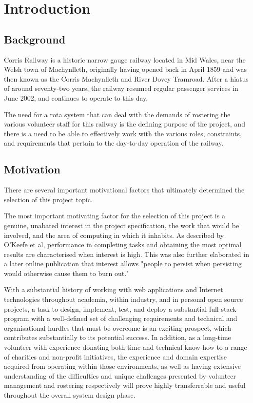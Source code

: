 \chapter{Introduction}

\section{Background}
Corris Railway is a historic narrow gauge railway located in Mid Wales, near the Welsh town of Machynlleth, originally having opened back in April 1859 and was then known as the Corris Machynlleth and River Dovey Tramroad. \cite{DEVEREAUX01} After a hiatus of around seventy-two years, the railway resumed regular passenger services in June 2002, and continues to operate to this day. \cite{CORRISSOCIETY1}

The need for a rota system that can deal with the demands of rostering the various volunteer staff for this railway is the defining purpose of the project, and there is a need to be able to effectively work with the various roles, constraints, and requirements that pertain to the day-to-day operation of the railway. 

\section{Motivation}
There are several important motivational factors that ultimately determined the selection of this project topic.

The most important motivating factor for the selection of this project is a genuine, unabated interest in the project specification, the work that would be involved, and the area of computing in which it inhabits. As described by O'Keefe et al, performance in completing tasks and obtaining the most optimal results are characterised when interest is high. \cite{OKEEFE201470} This was also further elaborated in a later online publication that interest allows "people to persist when persisting would otherwise cause them to burn out." \cite{OKEEFE2014WEB}

With a substantial history of working with web applications and Internet technologies throughout academia, within industry, and in personal open source projects, a task to design, implement, test, and deploy a substantial full-stack program with a well-defined set of challenging requirements and technical and organisational hurdles that must be overcome is an exciting prospect, which contributes substantially to its potential success. In addition, as a long-time volunteer with experience donating both time and technical know-how to a range of charities and non-profit initiatives, the experience and domain expertise acquired from operating within those environments, as well as  having extensive understanding of the difficulties and unique challenges presented by volunteer management and rostering respectively will prove highly transferrable and useful throughout the overall system design phase.


